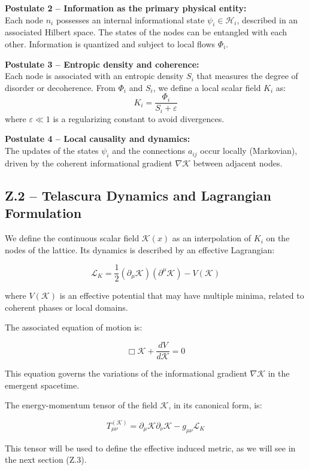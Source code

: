 \documentclass[12pt]{article}
\begin{document}
\textbf{Postulate 2 – Information as the primary physical entity:}\\
Each node $n_i$ possesses an internal informational state $\psi_i \in \mathcal{H}_i$, described in an associated Hilbert space. The states of the nodes can be entangled with each other. Information is quantized and subject to local flows $\Phi_i$.

\textbf{Postulate 3 – Entropic density and coherence:}\\
Each node is associated with an entropic density $S_i$ that measures the degree of disorder or decoherence. From $\Phi_i$ and $S_i$, we define a local scalar field $K_i$ as:
\[
K_i = \frac{\Phi_i}{S_i + \varepsilon}
\]
where $\varepsilon \ll 1$ is a regularizing constant to avoid divergences.

\textbf{Postulate 4 – Local causality and dynamics:}\\
The updates of the states $\psi_i$ and the connections $a_{ij}$ occur locally (Markovian), driven by the coherent informational gradient $\nabla \mathcal{K}$ between adjacent nodes.

\vspace{1em}
\subsection*{Z.2 – Telascura Dynamics and Lagrangian Formulation}

We define the continuous scalar field $\mathcal{K}(x)$ as an interpolation of $K_i$ on the nodes of the lattice. Its dynamics is described by an effective Lagrangian:

\[
\mathcal{L}_K = \frac{1}{2} (\partial_\mu \mathcal{K})(\partial^\mu \mathcal{K}) - V(\mathcal{K})
\]

where $V(\mathcal{K})$ is an effective potential that may have multiple minima, related to coherent phases or local domains.

The associated equation of motion is:

\[
\Box \mathcal{K} + \frac{dV}{d\mathcal{K}} = 0
\]

This equation governs the variations of the informational gradient $\nabla \mathcal{K}$ in the emergent spacetime.

The energy-momentum tensor of the field $\mathcal{K}$, in its canonical form, is:

\[
T^{(\mathcal{K})}_{\mu\nu} = \partial_\mu \mathcal{K} \partial_\nu \mathcal{K} - g_{\mu\nu} \mathcal{L}_K
\]

This tensor will be used to define the effective induced metric, as we will see in the next section (Z.3).
\end{document}
